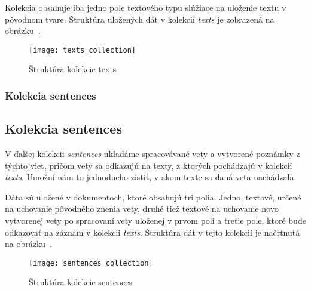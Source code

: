 Kolekcia obsahuje iba jedno pole textového typu slúžiace na uloženie textu v pôvodnom tvare. Štruktúra uložených dát v kolekcií \textit{texts} je zobrazená na obrázku~.

\begin{figure}[H]
	\begin{center}\texttt{[image: texts\_collection]}\end{center}
	\caption[Štruktúra kolekcie texts]{Štruktúra kolekcie texts}\label{fig:texts_collection_structure}
\end{figure}

%
%
{
	\subsubsection{Kolekcia sentences}
}
{
	\subsection{Kolekcia sentences}
}
V ďalšej kolekcii \textit{sentences} ukladáme spracovávané vety a vytvorené poznámky z týchto viet, pričom vety sa odkazujú na texty, z ktorých pochádzajú v kolekcií \textit{texts}. Umožní nám to jednoducho zistiť, v akom texte sa daná veta nachádzala.

Dáta sú uložené v dokumentoch, ktoré obsahujú tri polia. Jedno, textové, určené na uchovanie pôvodného znenia vety, druhé tiež textové na uchovanie novo vytvorenej vety po spracovaní vety uloženej v prvom poli a tretie pole, ktoré bude odkazovať na záznam v kolekcii \textit{texts}. Štruktúra dát v tejto kolekcií je načrtnutá na obrázku~.

\begin{figure}[H]
	\begin{center}\texttt{[image: sentences\_collection]}\end{center}
	\caption[Štruktúra kolekcie sentences]{Štruktúra kolekcie sentences}\label{fig:sentences_collection_structure}
\end{figure}

